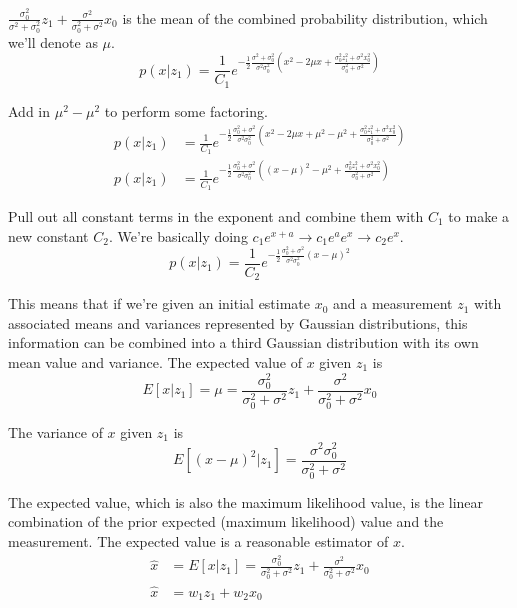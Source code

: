 $\frac{\sigma_0^2}{\sigma^2 + \sigma_0^2} z_1 + \frac{\sigma^2}{\sigma_0^2 + \sigma^2} x_0$
is the mean of the combined probability distribution, which we'll denote as
$\mu$.
\begin{equation*}
  p(x|z_1) = \frac{1}{C_1} e^{-\frac{1}{2}
    \frac{\sigma^2 + \sigma_0^2}{\sigma^2 \sigma_0^2} \left(
      x^2 - 2\mu x +
      \frac{\sigma_0^2 z_1^2 + \sigma^2 x_0^2}{\sigma_0^2 + \sigma^2}
    \right)}
\end{equation*}

Add in $\mu^2 - \mu^2$ to perform some factoring.
\begin{align*}
  p(x|z_1) &= \frac{1}{C_1} e^{-\frac{1}{2}
    \frac{\sigma_0^2 + \sigma^2}{\sigma^2 \sigma_0^2} \left(
      x^2 - 2\mu x + \mu^2 - \mu^2 +
      \frac{\sigma_0^2 z_1^2 + \sigma^2 x_0^2}{\sigma_0^2 + \sigma^2}
    \right)} \\
  p(x|z_1) &= \frac{1}{C_1} e^{-\frac{1}{2}
    \frac{\sigma_0^2 + \sigma^2}{\sigma^2 \sigma_0^2} \left(
      (x - \mu)^2 - \mu^2 +
      \frac{\sigma_0^2 z_1^2 + \sigma^2 x_0^2}{\sigma_0^2 + \sigma^2}
    \right)}
\end{align*}

Pull out all constant terms in the exponent and combine them with $C_1$ to make
a new constant $C_2$. We're basically doing
$c_1 e^{x + a} \rightarrow c_1 e^a e^x \rightarrow c_2 e^x$.
\begin{equation*}
  p(x|z_1) = \frac{1}{C_2} e^{-\frac{1}{2}
    \frac{\sigma_0^2 + \sigma^2}{\sigma^2 \sigma_0^2} (x - \mu)^2}
\end{equation*}

This means that if we're given an initial estimate $x_0$ and a measurement $z_1$
with associated means and variances represented by Gaussian distributions, this
information can be combined into a third Gaussian distribution with its own mean
value and variance. The expected value of $x$ given $z_1$ is
\begin{equation}
  E[x|z_1] = \mu = \frac{\sigma_0^2}{\sigma_0^2 + \sigma^2}z_1 +
    \frac{\sigma^2}{\sigma_0^2 + \sigma^2}x_0
\end{equation}

The variance of $x$ given $z_1$ is
\begin{equation}
  E[(x - \mu)^2|z_1] = \frac{\sigma^2 \sigma_0^2}{\sigma_0^2 + \sigma^2}
\end{equation}

The expected value, which is also the maximum likelihood value, is the linear
combination of the prior expected (maximum likelihood) value and the
measurement. The expected value is a reasonable estimator of $x$.
\begin{align}
  \hat{x} &= E[x|z_1] = \frac{\sigma_0^2}{\sigma_0^2 + \sigma^2}z_1 +
    \frac{\sigma^2}{\sigma_0^2 + \sigma^2}x_0 \\
  \hat{x} &= w_1 z_1 + w_2 x_0 \nonumber
\end{align}


